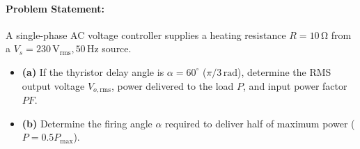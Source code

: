 \paragraph{Problem Statement:}
A single-phase AC voltage controller supplies a heating resistance $R = 10\,\si{\ohm}$ from a $V_s = 230\,\si{\volt}_{\mathrm{rms}}, 50\,\si{\hertz}$ source.
\begin{itemize}
  \item \textbf{(a)} If the thyristor delay angle is $\alpha = 60^\circ$ ($\pi/3\,\si{\radian}$), determine the RMS output voltage $V_{o,\mathrm{rms}}$, power delivered to the load $P$, and input power factor $PF$.
  \item \textbf{(b)} Determine the firing angle $\alpha$ required to deliver half of maximum power ($P = 0.5 P_{\max}$).
\end{itemize}


